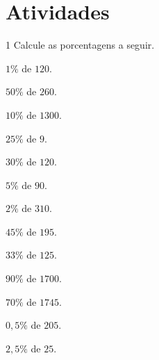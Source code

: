 \section*{Atividades}

\num{1} Calcule as porcentagens a seguir.

\begin{escolha}
\item $1\%$ de $120$.\\

\item $50\%$ de $260$.\\

\item $10\%$ de $1300$.\\

\item $25\%$ de $9$.\\

\item $30\%$ de $120$.\\

\item $5\%$ de $90$.\\

\item $2\%$ de $310$.\\

\item $45\%$ de $195$.\\

\item $33\%$ de $125$.\\

\item $90\%$ de $1700$.\\

\item $70\%$ de $1745$.\\

\item $0,5\%$ de $205$.\\

\item $2,5\%$ de $25$.\\

\end{escolha}

